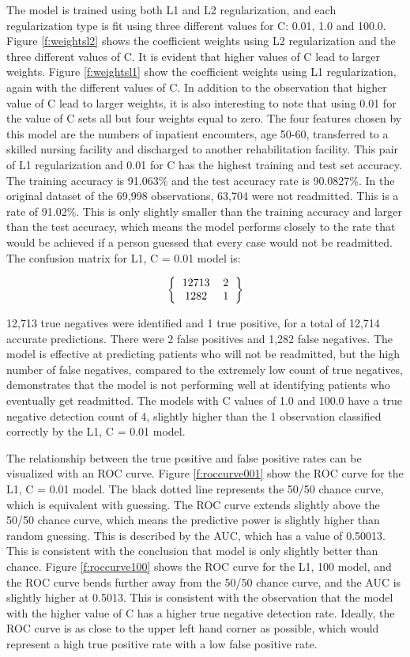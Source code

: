 \documentclass[sigconf]{acmart}
\begin{document}
The model is trained using both L1 and L2 regularization, and each regularization type is fit using three different values for C: 0.01, 1.0 and 100.0. Figure \ref{f:weightsl2} shows the coefficient weights using L2 regularization and the three different values of C. It is evident that higher values of C lead to larger weights. Figure \ref{f:weightsl1} show the coefficient weights using L1 regularization, again with the different values of C. In addition to the observation that higher value of C lead to larger weights, it is also interesting to note that using 0.01 for the value of C sets all but four weights equal to zero. The four features chosen by this model are the numbers of inpatient encounters, age 50-60, transferred to a skilled nursing facility and discharged to another rehabilitation facility. This pair of L1 regularization and 0.01 for C has the highest training and test set accuracy. The training accuracy is 91.063\% and the test accuracy rate is 90.0827\%. In the original dataset of the 69,998 observations, 63,704 were not readmitted. This is a rate of 91.02\%. This is only slightly smaller than the training accuracy and larger than the test accuracy, which means the model performs closely to the rate that would be achieved if a person guessed that every case would not be readmitted.
The confusion matrix for L1, C = 0.01 model is:

\[ 
\left \{
  \begin{tabular}{ccc}
  12713 & 2 \\
  1282 & 1 
  \end{tabular}
\right \}
\]

12,713 true negatives were identified and 1 true positive, for a total of 12,714 accurate predictions. There were 2 false positives and 1,282 false negatives. The model is effective at predicting patients who will not be readmitted, but the high number of false negatives, compared to the extremely low count of true negatives, demonstrates that the model is not performing well at identifying patients who eventually get readmitted. The models with C values of 1.0 and 100.0 have a true negative detection count of 4, slightly higher than the 1 observation classified correctly by the L1, C = 0.01 model.

The relationship between the true positive and false positive rates can be visualized with an ROC curve. Figure \ref{f:roccurve001} show the ROC curve for the L1, C = 0.01 model. The black dotted line represents the 50/50 chance curve, which is equivalent with guessing. The ROC curve extends slightly above the 50/50 chance curve, which means the predictive power is slightly higher than random guessing. This is described by the AUC, which has a value of 0.50013. This is consistent with the conclusion that model is only slightly better than chance. Figure \ref{f:roccurve100} shows the ROC curve for the L1, 100 model, and the ROC curve bends further away from the 50/50 chance curve, and the AUC is slightly higher at 0.5013. This is consistent with the observation that the model with the higher value of C has a higher true negative detection rate. Ideally, the ROC curve is as close to the upper left hand corner as possible, which would represent a high true positive rate with a low false positive rate.
\end{document}
